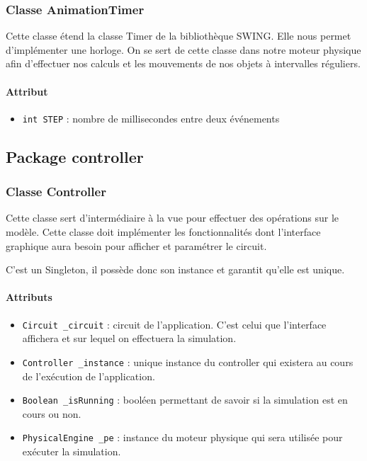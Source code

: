 \documentclass{report}
\begin{document}
\subsubsection{Classe AnimationTimer}

Cette classe étend la classe Timer de la bibliothèque SWING. Elle nous permet d'implémenter une horloge. On se sert de cette classe dans notre moteur physique afin d'effectuer nos calculs et les mouvements de nos objets à intervalles réguliers.

\paragraph*{Attribut}
\begin{itemize}
\item \texttt{int STEP} : nombre de millisecondes entre deux événements
\end{itemize}

\subsection{Package controller}

\subsubsection{Classe Controller}

Cette classe sert d'intermédiaire à la vue pour effectuer des opérations sur le modèle. Cette classe doit implémenter les fonctionnalités dont l'interface graphique aura besoin pour afficher et paramétrer le circuit.

C'est un Singleton, il possède donc son instance et garantit qu'elle est unique.

\paragraph*{Attributs}
\begin{itemize}
\item \texttt{Circuit \_circuit} : circuit de l'application. C'est celui que l'interface affichera et sur lequel on effectuera la simulation.
\item \texttt{Controller \_instance} : unique instance du controller qui existera au cours de l'exécution de l'application.
\item \texttt{Boolean \_isRunning} : booléen permettant de savoir si la simulation est en cours ou non.
\item \texttt{PhysicalEngine \_pe} : instance du moteur physique qui sera utilisée pour exécuter la simulation.
\end{itemize}
\end{document}
